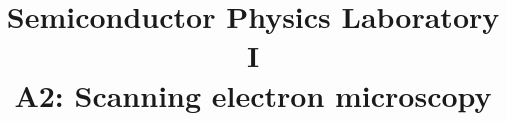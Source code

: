 \documentclass[11pt,english]{article}
\title{Semiconductor Physics Laboratory \RN{1}\\A2: Scanning electron microscopy}
\date{}
\begin{document}
\maketitle
\begin{multicols}{2}
	
	
	
	
	
\end{multicols}
\printbibliography[heading=bibintoc]
\listoffigures
\listoftables
\end{document}
